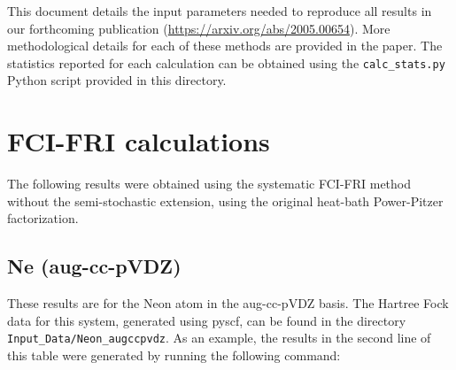 \documentclass[12pt, landscape]{article}
\begin{document}
This document details the input parameters needed to reproduce all results in our forthcoming publication (\url{https://arxiv.org/abs/2005.00654}). More methodological details for each of these methods are provided in the paper. The statistics reported for each calculation can be obtained using the \texttt{calc\_stats.py} Python script provided in this directory.

\section*{FCI-FRI calculations}

The following results were obtained using the systematic FCI-FRI method without the semi-stochastic extension, using the original heat-bath Power-Pitzer factorization. 

\subsection*{Ne (aug-cc-pVDZ)}
These results are for the Neon atom in the aug-cc-pVDZ basis. The Hartree Fock data for this system, generated using pyscf, can be found in the directory \texttt{Input\_Data/Neon\_augccpvdz}. As an example, the results in the second line of this table were generated by running the following command:
\end{document}

